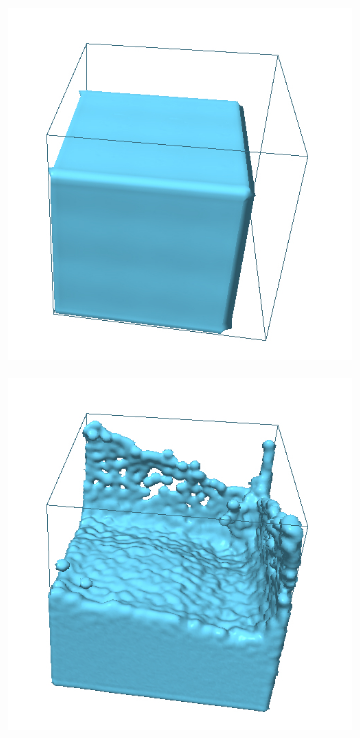 \begin{figure}[h!]
    \captionsetup{justification=centering}
	\centering
	\begin{subfigure}[t]{.3\textwidth}
			\centering
        	\includegraphics[scale=0.8]{obrazky-figures/app/Simple01.jpg}
        	\label{fig:GaussSeidl}
	\end{subfigure}%
	\begin{subfigure}[t]{.3\textwidth}
		\centering
		\includegraphics[scale=0.8]{obrazky-figures/app/Simple02.jpg}

\end{subfigure}
\end{figure}
